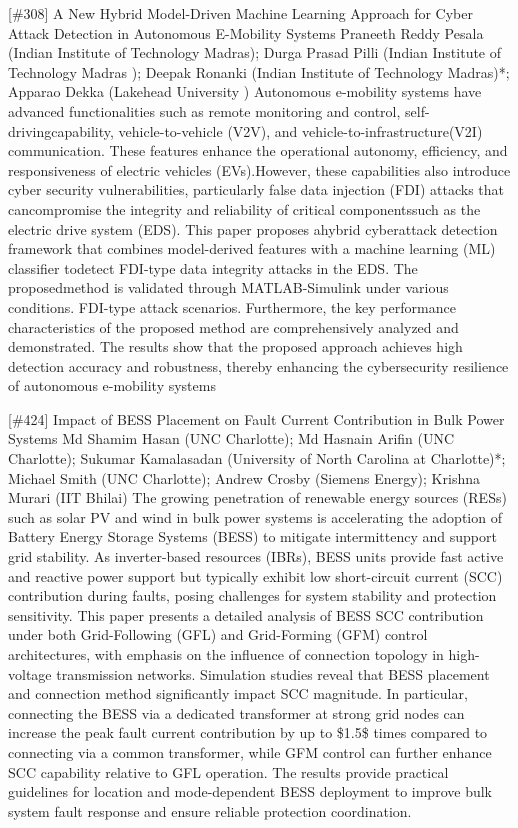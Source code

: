 {} \begin{abstract_online} {[\#308] A New Hybrid Model-Driven Machine Learning Approach for Cyber Attack Detection in Autonomous E-Mobility Systems} {} {Praneeth Reddy Pesala (Indian Institute of Technology Madras); Durga Prasad Pilli (Indian Institute of Technology Madras ); Deepak  Ronanki (Indian Institute of Technology Madras)*; Apparao  Dekka (Lakehead University )} {} Autonomous e-mobility systems have advanced functionalities such as remote monitoring and control, self-drivingcapability, vehicle-to-vehicle (V2V), and vehicle-to-infrastructure(V2I) communication. These features enhance the operational autonomy, efficiency, and responsiveness of electric vehicles (EVs).However, these capabilities also introduce cyber security vulnerabilities, particularly false data injection (FDI) attacks that cancompromise the integrity and reliability of critical componentssuch as the electric drive system (EDS). This paper proposes ahybrid cyberattack detection framework that combines model-derived features with a machine learning (ML) classifier todetect FDI-type data integrity attacks in the EDS. The proposedmethod is validated through MATLAB-Simulink under various conditions. FDI-type attack scenarios. Furthermore, the key performance characteristics of the proposed method are comprehensively analyzed and demonstrated. The results show that the proposed approach achieves high detection accuracy and robustness, thereby enhancing the cybersecurity resilience of autonomous e-mobility systems \end{abstract_online} 
{} \begin{abstract_online} {[\#424] Impact of BESS Placement on Fault Current Contribution in Bulk Power Systems} {} {Md Shamim  Hasan (UNC Charlotte); Md Hasnain  Arifin (UNC Charlotte); Sukumar Kamalasadan (University of North Carolina at Charlotte)*; Michael Smith (UNC Charlotte); Andrew Crosby (Siemens Energy); Krishna Murari (IIT Bhilai)} {} The growing penetration of renewable energy sources (RESs) such as solar PV and wind in bulk power systems is accelerating the adoption of Battery Energy Storage Systems (BESS) to mitigate intermittency and support grid stability. As inverter-based resources (IBRs), BESS units provide fast active and reactive power support but typically exhibit low short-circuit current (SCC) contribution during faults, posing challenges for system stability and protection sensitivity. This paper presents a detailed analysis of BESS SCC contribution under both Grid-Following (GFL) and Grid-Forming (GFM) control architectures, with emphasis on the influence of connection topology in high-voltage transmission networks. Simulation studies reveal that BESS placement and connection method significantly impact SCC magnitude. In particular, connecting the BESS via a dedicated transformer at strong grid nodes can increase the peak fault current contribution by up to  \$1.5\$ times compared to connecting via a common transformer, while GFM control can further enhance SCC capability relative to GFL operation. The results provide practical guidelines for location and mode-dependent BESS deployment to improve bulk system fault response and ensure reliable protection coordination. \end{abstract_online} 
